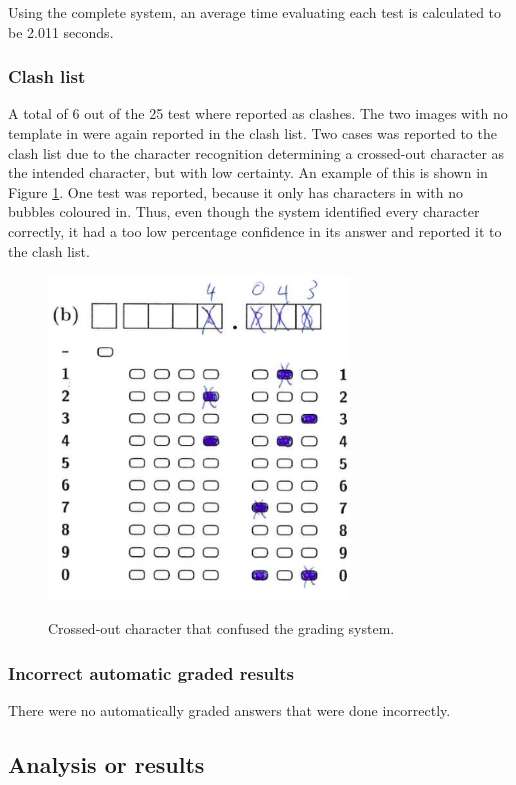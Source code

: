 Using the complete system, an average time evaluating each test is calculated to be 2.011 seconds. 

\subsubsection{Clash list}

A total of 6 out of the 25 test where reported as clashes. The two images with no template in were again reported in the clash list. Two cases was reported to the clash list due to the character recognition determining a crossed-out character as the intended character, but with low certainty. An example of this is shown in Figure \ref{fig:crossedOutCharacter}. One test was reported, because it only has characters in with no bubbles coloured in. Thus, even though the system identified every character correctly, it had a too low percentage confidence in its answer and reported it to the clash list. 

\begin{figure}
  \centering
  \includegraphics[width=8cm]{crossedOutCharacter}\\
  \caption{Crossed-out character that confused the grading system.}
  \label{fig:crossedOutCharacter}
\end{figure}

\subsubsection{Incorrect automatic graded results}

There were no automatically graded answers that were done incorrectly.

\subsection{Analysis or results}

